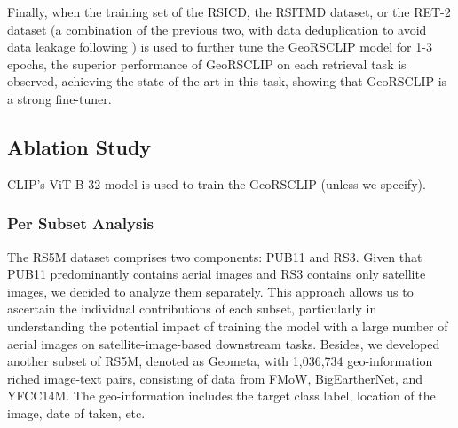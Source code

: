 \documentclass[journal]{IEEEtran}
\begin{document}
Finally, when the training set of the RSICD, the RSITMD dataset, or the RET-2 dataset (a combination of the previous two, with data deduplication to avoid data leakage following \cite{liu2023remoteclip}) is used to further tune the GeoRSCLIP model for 1-3 epochs, the superior performance of GeoRSCLIP on each retrieval task is observed, achieving the state-of-the-art in this task, showing that GeoRSCLIP is a strong fine-tuner.



\subsection{Ablation Study}
CLIP’s ViT-B-32 model is used to train the GeoRSCLIP (unless we specify). 
\subsubsection{Per Subset Analysis}
\label{per_subset_analysis}
The RS5M dataset comprises two components: PUB11 and RS3. Given that PUB11 predominantly contains aerial images and RS3 contains only satellite images, we decided to analyze them separately. This approach allows us to ascertain the individual contributions of each subset, particularly in understanding the potential impact of training the model with a large number of aerial images on satellite-image-based downstream tasks. Besides, we developed another subset of RS5M, denoted as Geometa, with 1,036,734 geo-information riched image-text pairs, consisting of data from FMoW, BigEartherNet, and YFCC14M. The geo-information includes the target class label, location of the image, date of taken, etc.
\end{document}
